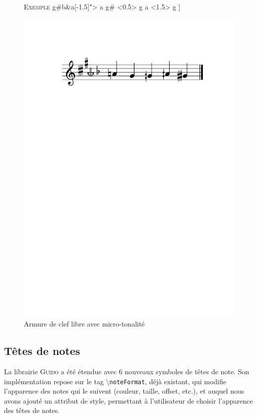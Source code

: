 \documentclass{article}
\newenvironment{gmncode}	{\vspace{-2mm}\small\verbatim}{\endverbatim\vspace{-2mm}}
\newcommand{\guido}			{\textsc{Guido}}
\newcommand{\code}[1]		{{\small \texttt{#1}}}
\newcommand{\guidotag}[1]	{\textbackslash\code{#1}}
\newcommand{\exemple}		{\vspace{2mm}\hspace*{-3mm}\textsc{Exemple}}
\begin{document}
\begin{figure}[h]
\exemple
\begin{gmncode}
[
  \key<"free=c[1.5]g#b&a[-1.5]"> a g# 
  \alter<0.5> g  a \alter<1.5> g 
]
\end{gmncode}
\begin{center}
\includegraphics[width=0.75\columnwidth]{img/partitions/freekey.pdf}
\end{center}
\caption{Armure de clef libre avec micro-tonalité}
\label{fig:freekey}
\end{figure}


\subsection{Têtes de notes}\label{subsec:tetes_notes}

La librairie \guido{} a été étendue avec 6 nouveaux symboles de têtes de note. Son implémentation repose sur le tag \guidotag{noteFormat}, déjà existant, qui modifie l'apparence des notes qui le suivent (couleur, taille, offset, etc.), et auquel nous avons ajouté un attribut de style, permettant à l'utilisateur de choisir l'apparence des têtes de notes.
\end{document}
